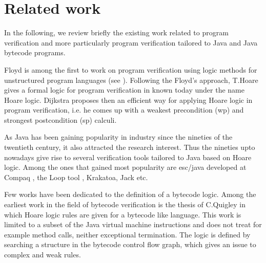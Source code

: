 \section{Related work} \label{relWorkWp}

In the following, we review briefly the existing work related to program verification
 and more particularly program verification tailored to Java and Java bytecode programs. 

 Floyd is among the first to work on program verification using logic methods for unstructured program
 languages (see \cite{F67amp}). Following the Floyd's approach, T.Hoare gives a formal logic for program verification in \cite{Hoare69ABC} known
 today under the name Hoare logic. Dijkstra \cite{WPCDS} proposes then an efficient way for applying Hoare logic in
 program verification, i.e. he comes up with a weakest precondition (wp) and strongest postcondition (sp) calculi. 

 

As Java has been gaining popularity in industry since the nineties of the twentieth century,
it also attracted the research interest.   
Thus the nineties upto nowadays give rise to several verification tools tailored to Java
 based on Hoare logic. Among the ones that gained most popularity are
esc/java developed at Compaq \cite{escjava}, the Loop tool \cite{jacobs03java}, Krakatoa, Jack \cite{BRL-JACK} etc.   

Few works have been dedicated to the definition of a bytecode logic. Among the earliest work in the field of bytecode verification 
is the thesis of C.Quigley  \cite{Quigley03PLJ} in which Hoare logic rules are given for a bytecode like language. This work is limited 
to a subset of the Java virtual machine instructions and does not treat for example method calls,
 neither exceptional termination. The logic is defined by searching a structure in the bytecode control flow graph,
 which gives an issue to complex and weak rules.

